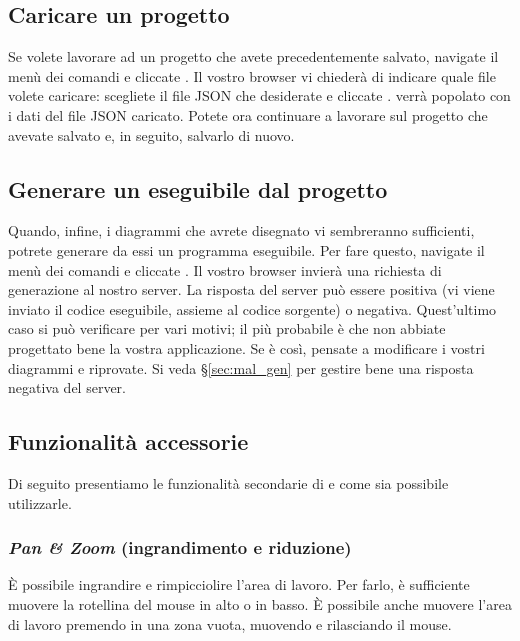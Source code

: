 \subsection{Caricare un progetto} \label{sec:load}

Se volete lavorare ad un progetto che avete precedentemente salvato, navigate il menù dei comandi e cliccate . Il vostro browser vi chiederà di indicare quale file volete caricare: scegliete il file JSON che desiderate e cliccate . \proj{} verrà popolato con i dati del file JSON caricato. Potete ora continuare a lavorare sul progetto che avevate salvato e, in seguito, salvarlo di nuovo.



\subsection{Generare un eseguibile dal progetto} \label{sec:gen}

Quando, infine, i diagrammi che avrete disegnato vi sembreranno sufficienti, potrete generare da essi un programma eseguibile. Per fare questo, navigate il menù dei comandi e cliccate . Il vostro browser invierà una richiesta di generazione al nostro server. La risposta del server può essere positiva (vi viene inviato il codice eseguibile, assieme al codice sorgente) o negativa. Quest'ultimo caso si può verificare per vari motivi; il più probabile è che non abbiate progettato bene la vostra applicazione. Se è così, pensate a modificare i vostri diagrammi e riprovate. Si veda §\ref{sec:mal_gen} per gestire bene una risposta negativa del server.



\subsection{Funzionalità accessorie} \label{sec:extra}

Di seguito presentiamo le funzionalità secondarie di \proj{} e come sia possibile utilizzarle.

\subsubsection{\emph{Pan \& Zoom} (ingrandimento e riduzione)}
È possibile ingrandire e rimpicciolire l'area di lavoro. Per farlo, è sufficiente muovere la rotellina del mouse in alto o in basso. È possibile anche muovere l'area di lavoro premendo in una zona vuota, muovendo e rilasciando il mouse. 

